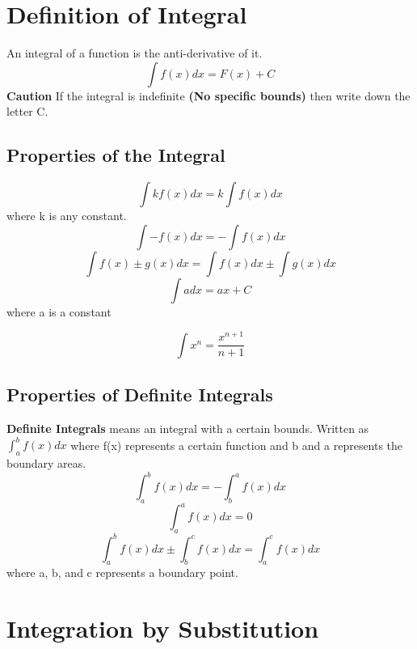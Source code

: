 \documentclass[12pt]{article}
\begin{document}
\section{Definition of Integral}
An integral of a function is the anti-derivative of it. 
\begin{equation}
    \int f(x) dx = F(x) + C
\end{equation}
\textbf{Caution} If the integral is indefinite \textbf{(No specific bounds)} then write down the letter C. 
\subsection{Properties of the Integral}
\begin{equation}
    \int k f(x) dx = k \int f(x) dx
\end{equation}
where k is any constant.
\begin{equation}
    \int -f(x) dx = - \int f(x) dx 
\end{equation}
\begin{equation}
    \int f(x) \pm g(x) dx= \int f(x) dx \pm \int g(x) dx  
\end{equation}
\begin{equation}
    \int a dx = ax + C
\end{equation} where a is a constant 

\begin{equation}
    \int x^{n} = \frac{x^{n+1}}{n+1}
\end{equation}
\subsection{Properties of Definite Integrals}
\textbf{Definite Integrals} means an integral with a certain bounds. 
Written as $\int_{a}^{b} f(x) dx$ where f(x) represents a certain function and b and a represents the boundary areas. \newline 
\begin{equation}
    \int_{a}^{b} f(x) dx = - \int_{b}^{a} f(x) dx 
\end{equation}
\begin{equation}
      \int_{a}^{a} f(x) dx = 0
\end{equation}
\begin{equation}
    \int_{a}^{b}f(x)dx \pm \int_{b}^{c}f(x)dx = \int_{a}^{c} f(x)dx
\end{equation}
where a, b, and c represents a boundary point. 
\section{Integration by Substitution}
\end{document}
